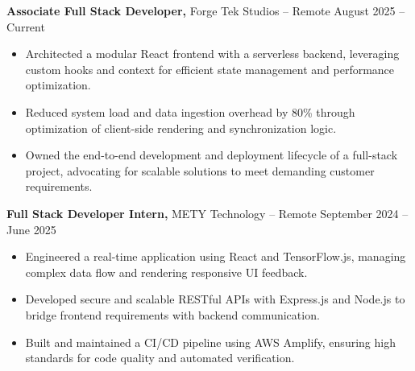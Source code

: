\documentclass[11pt]{article}       %
\begin{document}
\textbf{Associate Full Stack Developer,} {Forge Tek Studios} -- Remote \hfill August 2025 -- Current 
\vspace{-9pt}
\begin{itemize}
  \item Architected a modular React frontend with a serverless backend, leveraging custom hooks and context for efficient state management and performance optimization.
  \item Reduced system load and data ingestion overhead by 80\% through optimization of client-side rendering and synchronization logic.
  \item Owned the end-to-end development and deployment lifecycle of a full-stack project, advocating for scalable solutions to meet demanding customer requirements.
\end{itemize}

\textbf{Full Stack Developer Intern,} {METY Technology} -- Remote \hfill September 2024 -- June 2025 
\vspace{-9pt}
\begin{itemize}
  \item Engineered a real-time application using React and TensorFlow.js, managing complex data flow and rendering responsive UI feedback.
  \item Developed secure and scalable RESTful APIs with Express.js and Node.js to bridge frontend requirements with backend communication.
  \item Built and maintained a CI/CD pipeline using AWS Amplify, ensuring high standards for code quality and automated verification.
\end{itemize}

\end{document}
